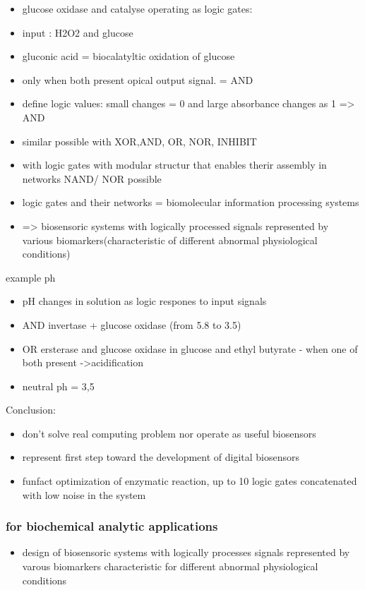 \documentclass[runningheads]{llncs}
\begin{document}
\begin{itemize}
	\item glucose oxidase and catalyse operating as logic gates: 
	\item input : H2O2 and glucose
	\item gluconic acid = biocalatyltic oxidation of glucose 
	\item only when both present opical output signal. = AND
	\item define logic values: small changes = 0 and large absorbance changes as 1 => AND
	\item similar possible with XOR,AND, OR, NOR, INHIBIT
	\item with logic gates with modular structur that enables therir assembly in networks NAND/ NOR possible
	\item logic gates and their networks = biomolecular information processing systems 
	\item => biosensoric systems with logically processed signals represented by various biomarkers(characteristic of different abnormal physiological conditions)
\end{itemize}

example ph
\begin{itemize}
	\item pH changes in solution as logic respones to input signals
	\item AND invertase + glucose oxidase (from 5.8 to 3.5)
	\item OR ersterase and glucose oxidase in glucose and ethyl butyrate - when one of both present ->acidification  
	\item neutral ph = 3,5
\end{itemize}
Conclusion: 
\begin{itemize}
	\item don't solve real computing problem  nor operate as useful biosensors 
	\item represent first step toward the development of digital biosensors 
	\item funfact optimization of enzymatic reaction, up to 10 logic gates concatenated with low noise in the system 
\end{itemize}

	\subsubsection{for biochemical analytic applications}
		\begin{itemize}
			\item design of biosensoric systems with logically processes signals represented by varous biomarkers characteristic for different abnormal physiological conditions
		\end{itemize}
\end{document}

